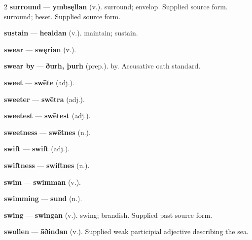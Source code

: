 \begin{multicols}{2}
\textbf{surround} — \textbf{ymbsęllan} (v.). surround; envelop. Supplied source form. surround; beset. Supplied source form.\par
\textbf{sustain} — \textbf{healdan} (v.). maintain; sustain.\par
\textbf{swear} — \textbf{swęrian} (v.).\par
\textbf{swear by} — \textbf{ðurh, þurh} (prep.). by. Accusative oath standard.\par
\textbf{sweet} — \textbf{swēte} (adj.).\par
\textbf{sweeter} — \textbf{swētra} (adj.).\par
\textbf{sweetest} — \textbf{swētest} (adj.).\par
\textbf{sweetness} — \textbf{swētnes} (n.).\par
\textbf{swift} — \textbf{swift} (adj.).\par
\textbf{swiftness} — \textbf{swiftnes} (n.).\par
\textbf{swim} — \textbf{swimman} (v.).\par
\textbf{swimming} — \textbf{sund} (n.).\par
\textbf{swing} — \textbf{swingan} (v.). swing; brandish. Supplied past source form.\par
\textbf{swollen} — \textbf{āðindan} (v.). Supplied weak participial adjective describing the sea.\par

\end{multicols}
